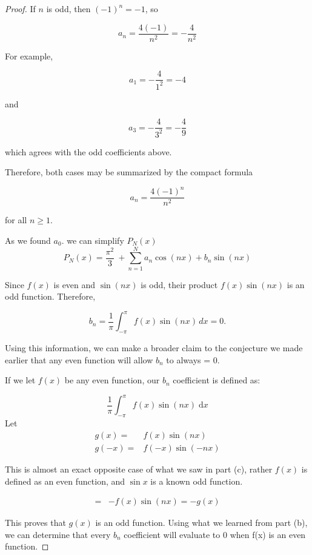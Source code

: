 \documentclass[12pt]{article}
\begin{document}
\begin{enumerate}[label=(\alph*)]
\begin{proof}
    If $n$ is odd, then $(-1)^n = -1$, so
    
    \[a_n = \frac{4(-1)}{n^2} = -\frac{4}{n^2}\]
    
    For example,
    
    \[a_1 = -\frac{4}{1^2} = -4\]
    
    and
    
    \[a_3 = -\frac{4}{3^2} = -\frac49\]
    
    which agrees with the odd coefficients above.
    
    \vspace{.1in}
    
    Therefore, both cases may be summarized by the compact formula
    
    \[a_n = \frac{4(-1)^n}{n^2}\]
    
    for all $n \geq 1$.

    \vspace{.1in}

    As we found $a_0$. we can simplify $P_N(x)$
    \[P_N(x) = \dfrac{\pi^2}{3}\ + \sum_{n=1}^{N}a_n\cos({nx}) + b_n\sin({nx})\]

    Since $f(x)$ is even and $\sin(nx)$ is odd, their product
    $f(x)\sin(nx)$ is an odd function. Therefore,
    
    \[b_n = \frac{1}{\pi}\int_{-\pi}^{\pi} f(x)\sin(nx)\,dx = 0.\] 
    
    Using this information, we can make a broader claim to the conjecture we made earlier that any even function will allow $b_n$ to always = 0.

    \vspace{.1in}

    If we let $f(x)$ be any even function, our $b_n$ coefficient is defined as:

    \[\dfrac{1}{\pi}\int_{-\pi}^{\pi}f(x)\sin({nx}) \; \mathrm{d}x\]
    \vspace{.1in}
    Let 
    \begin{align}
        g(x) = & f(x)\sin({nx}) \\
        g(-x) = & f(-x)\sin(-nx)
    \end{align}

    This is almost an exact opposite case of what we saw in part (c), rather $f(x)$ is defined as an even function, and $\sin{x}$ is a known odd function. 

    \begin{align}
        = & -f(x)\sin(nx)
        = - g(x)
    \end{align}

    This proves that $g(x)$ is an odd function. Using what we learned from part (b), we can determine that every $b_n$ coefficient will evaluate to 0 when f(x) is an even function.
    
    
\end{proof}
    
\end{enumerate}
\end{document}
